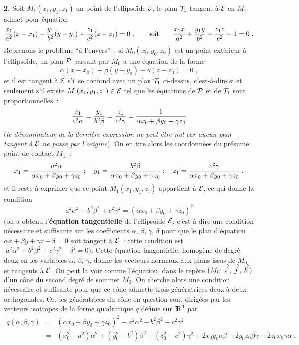 \documentclass{article}
\begin{document}
\msk
{\bf 2.} Soit $M_1(x_1,y_1,z_1)$ un point de l'ellipso\"\i de ${\cal E}$, le plan ${\cal T}_1$ tangent \`a ${\cal E}$ en $M_1$ admet pour \'equation\vv
$${x_1\over a^2}(x-x_1)+{y_1\over b^2}(y-y_1)+{z_1\over c^2}(z-z_1)=0\;,\qquad{\rm soit}\qquad{x_1x\over a^2}+{y_1y\over b^2}+{z_1z\over c^2}-1=0\;.$$
Reprenons le probl\`eme ``\`a l'envers''~: si $M_0(x_0,y_0,z_0)$ est un point ext\'erieur \`a l'ellipso\"\i de, un plan ${\cal P}$ passant par $M_0$ a une \'equation de la forme\vv
$$\alpha(x-x_0)+\beta(y-y_0)+\gamma(z-z_0)=0\;,$$
et il est tangent \`a ${\cal E}$ s'il se confond avec un plan ${\cal T}_1$ ci-dessus, c'est-\`a-dire si et seulement s'il existe $M_1(x_1,y_1,z_1)\in{\cal E}$ tel que les \'equations de ${\cal P}$ et de ${\cal T}_1$ sont proportionnelles~:\vv
$${x_1\over a^2\alpha}={y_1\over b^2\beta}={z_1\over c^2\gamma}={1\over\alpha x_0+\beta y_0+\gamma z_0}$$
({\it le d\'enominateur de la derni\`ere expression ne peut \^etre nul car aucun plan tangent \`a ${\cal E}$ ne passe par l'origine}). On en tire alors les coordonn\'ees du pr\'esum\'e point de contact $M_1$~:\vv
$$x_1={a^2\alpha\over\alpha x_0+\beta y_0+\gamma z_0}\;;\quad
  y_1={b^2\beta\over\alpha x_0+\beta y_0+\gamma z_0}\;;\quad 
  z_1={c^2\gamma\over\alpha x_0+\beta y_0+\gamma z_0}\;.$$
et il reste \`a exprimer que ce  point $M_1(x_1,y_1,z_1)$ appartient \`a ${\cal E}$, ce qui donne la condition\vv
$$a^2\alpha^2+b^2\beta^2+c^2\gamma^2=(\alpha x_0+\beta y_0+\gamma z_0)^2$$
(on a obtenu l'{\bf \'equation tangentielle} de l'ellipso\"\i de ${\cal E}$, c'est-\`a-dire une condition n\'ecessaire et suffisante sur les coefficients $\alpha$, $\beta$, $\gamma$, $\delta$ pour que le plan d'\'equation $\alpha x+\beta y+\gamma z+\delta=0$ soit tangent \`a ${\cal E}$~: cette condition est $\;a^2\alpha^2+b^2\beta^2+c^2\gamma^2-\delta^2=0$). Cette \'equation tangentielle, homog\`ene de degr\'e deux en les variables $\alpha$, $\beta$, $\gamma$, donne les vecteurs normaux aux plans issus de $M_0$ et tangents \`a ${\cal E}$. On peut la voir comme l'\'equation, dans le rep\`ere $(M_0;\vect{i},\vect{j},\vect{k})$ d'un c\^one du second degr\'e de sommet $M_0$. On cherche alors une condition n\'ecessaire et suffisante pour que ce c\^one admette trois g\'en\'eratrices deux \`a deux orthogonales. Or, les g\'en\'eratrices du c\^one en question sont dirig\'ees par les vecteurs isotropes de la forme quadratique $q$ d\'efinie sur ${\rm I\kern-0.6mm R}^3$ par\vv
\begin{eqnarray*}
q(\alpha,\beta,\gamma) & = & (\alpha x_0+\beta y_0+\gamma z_0)^2-a^2\alpha^2-b^2\beta^2-c^2\gamma^2\\
& = & (x_0^2-a^2)\alpha^2+(y_0^2-b^2)\beta^2+(z_0^2-c^2)\gamma^2+2x_0y_0\alpha\beta+2y_0z_0\beta\gamma+2z_0x_0\gamma\alpha\;.
\end{eqnarray*}
\end{document}
